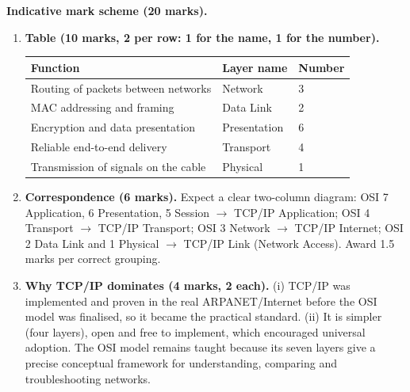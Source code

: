 \documentclass[11pt]{article}
\begin{document}
\begin{corrige}
\textbf{Indicative mark scheme (20 marks).}
\begin{enumerate}
\item \textbf{Table (10 marks, 2 per row: 1 for the name, 1 for the number).}
\begin{center}
\begin{tabularx}{\linewidth}{|X|l|l|}
\hline
\rowcolor{popblueL} \textbf{Function} & \textbf{Layer name} & \textbf{Number} \\
\hline
Routing of packets between networks & Network & 3 \\
\hline
MAC addressing and framing & Data Link & 2 \\
\hline
Encryption and data presentation & Presentation & 6 \\
\hline
Reliable end-to-end delivery & Transport & 4 \\
\hline
Transmission of signals on the cable & Physical & 1 \\
\hline
\end{tabularx}
\end{center}
\item \textbf{Correspondence (6 marks).} Expect a clear two-column diagram: OSI 7 Application, 6 Presentation, 5 Session $\rightarrow$ TCP/IP Application; OSI 4 Transport $\rightarrow$ TCP/IP Transport; OSI 3 Network $\rightarrow$ TCP/IP Internet; OSI 2 Data Link and 1 Physical $\rightarrow$ TCP/IP Link (Network Access). Award 1.5 marks per correct grouping.
\item \textbf{Why TCP/IP dominates (4 marks, 2 each).} (i) TCP/IP was implemented and proven in the real ARPANET/Internet before the OSI model was finalised, so it became the practical standard. (ii) It is simpler (four layers), open and free to implement, which encouraged universal adoption. The OSI model remains taught because its seven layers give a precise conceptual framework for understanding, comparing and troubleshooting networks.
\end{enumerate}
\end{corrige}
\end{document}
